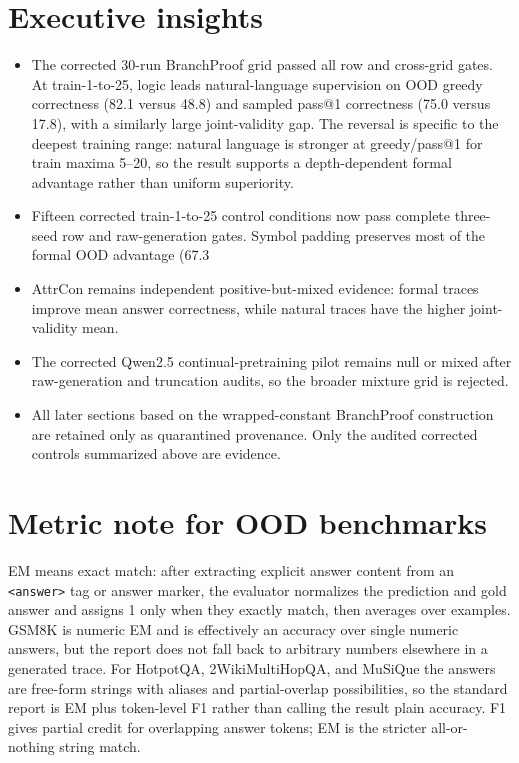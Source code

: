 \documentclass[10pt]{article}
\begin{document}
\section{Executive insights}
\begin{itemize}
\item The corrected 30-run BranchProof grid passed all row and cross-grid gates. At train-1-to-25, logic leads natural-language supervision on OOD greedy correctness (82.1 versus 48.8) and sampled pass@1 correctness (75.0 versus 17.8), with a similarly large joint-validity gap. The reversal is specific to the deepest training range: natural language is stronger at greedy/pass@1 for train maxima 5--20, so the result supports a depth-dependent formal advantage rather than uniform superiority.
\item Fifteen corrected train-1-to-25 control conditions now pass complete three-seed row and raw-generation gates. Symbol padding preserves most of the formal OOD advantage (67.3%
\item AttrCon remains independent positive-but-mixed evidence: formal traces improve mean answer correctness, while natural traces have the higher joint-validity mean.
\item The corrected Qwen2.5 continual-pretraining pilot remains null or mixed after raw-generation and truncation audits, so the broader mixture grid is rejected.
\item All later sections based on the wrapped-constant BranchProof construction are retained only as quarantined provenance. Only the audited corrected controls summarized above are evidence.
\end{itemize}

\section{Metric note for OOD benchmarks}
EM means exact match: after extracting explicit answer content from an \texttt{<answer>} tag or answer marker, the evaluator normalizes the prediction and gold answer and assigns 1 only when they exactly match, then averages over examples. GSM8K is numeric EM and is effectively an accuracy over single numeric answers, but the report does not fall back to arbitrary numbers elsewhere in a generated trace. For HotpotQA, 2WikiMultiHopQA, and MuSiQue the answers are free-form strings with aliases and partial-overlap possibilities, so the standard report is EM plus token-level F1 rather than calling the result plain accuracy. F1 gives partial credit for overlapping answer tokens; EM is the stricter all-or-nothing string match.
\end{document}
